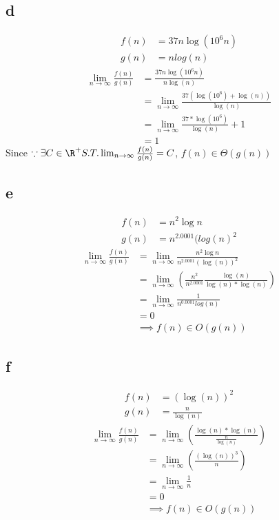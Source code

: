 \subsection*{d}
\begin{align*}
    f(n) &= 37 n \log(10^6n)\\
    g(n) &= n log(n)
\end{align*}
\begin{align*}
    \lim_{n \to \infty} \frac{f(n)}{g(n)} &= \frac{37 n \log(10^6 n)}{n \log (n)}\\
    &= \lim_{n \to \infty} \frac{37(\log(10^6) + \log(n))}{\log(n)}\\
    &= \lim_{n \to \infty} \frac{37 * \log(10^6)}{\log(n)} + 1\\
    &= 1
\end{align*}
Since $\because \exists C \in \R ^+ S.T. \lim_{n \to \infty} \frac{f(n)}{g(n)} = C$, $f(n) \in \Theta(g(n))$

\subsection*{e}
\begin{align*}
    f(n) &= n^2 \log n\\
    g(n) &= n^{2.0001}(log(n)^2
\end{align*}{}
\begin{align*}
    \lim_{n \to \infty} \frac{f(n)}{g(n)} &= \lim _{n \to \infty} \frac{n^2 \log n}{n^{2.0001} (\log (n)) ^ 2 }\\
    &= \lim_{n \to \infty}( \frac{n^2}{n^{2.0001}} \frac{\log(n)}{\log(n) * \log(n)})\\
    &= \lim_{n \to \infty} \frac{1}{n^{0.0001}log(n)}\\
    &= 0\\
    &\implies f(n) \in O(g(n))
\end{align*}

\subsection*{f}
\begin{align*}
    f(n) &= (\log(n))^2\\
    g(n) &= \frac{n}{\log(n)}
\end{align*}
\begin{align*}
    \lim_{n \to \infty}\frac{f(n)}{g(n)} &= \lim_{n \to \infty}(\frac{\log(n)* \log(n)}{\frac{n}{\log(n)}})\\
    &= \lim_{n \to \infty}(\frac{(\log(n))^3}{n})\\
    &= \lim_{n \to \infty} \frac{1}{n}\\
    &= 0\\
    &\implies f(n) \in O(g(n))
\end{align*}

